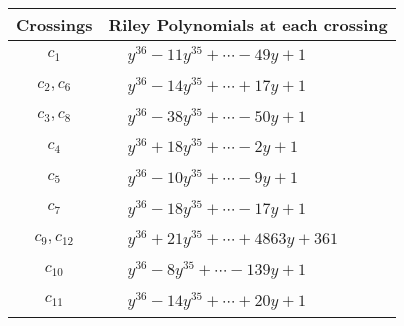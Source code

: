 \documentclass[1p]{elsarticle_modified}
\theoremstyle{definition}
\begin{document}
\begin{tabular}{m{50pt}|m{274pt}}
Crossings & \hspace{64pt}Riley Polynomials at each crossing \\
\hline $$\begin{aligned}c_{1}\end{aligned}$$&$\begin{aligned}
&y^{36}-11 y^{35}+\cdots-49 y+1
\end{aligned}$\\
\hline $$\begin{aligned}c_{2},c_{6}\end{aligned}$$&$\begin{aligned}
&y^{36}-14 y^{35}+\cdots+17 y+1
\end{aligned}$\\
\hline $$\begin{aligned}c_{3},c_{8}\end{aligned}$$&$\begin{aligned}
&y^{36}-38 y^{35}+\cdots-50 y+1
\end{aligned}$\\
\hline $$\begin{aligned}c_{4}\end{aligned}$$&$\begin{aligned}
&y^{36}+18 y^{35}+\cdots-2 y+1
\end{aligned}$\\
\hline $$\begin{aligned}c_{5}\end{aligned}$$&$\begin{aligned}
&y^{36}-10 y^{35}+\cdots-9 y+1
\end{aligned}$\\
\hline $$\begin{aligned}c_{7}\end{aligned}$$&$\begin{aligned}
&y^{36}-18 y^{35}+\cdots-17 y+1
\end{aligned}$\\
\hline $$\begin{aligned}c_{9},c_{12}\end{aligned}$$&$\begin{aligned}
&y^{36}+21 y^{35}+\cdots+4863 y+361
\end{aligned}$\\
\hline $$\begin{aligned}c_{10}\end{aligned}$$&$\begin{aligned}
&y^{36}-8 y^{35}+\cdots-139 y+1
\end{aligned}$\\
\hline $$\begin{aligned}c_{11}\end{aligned}$$&$\begin{aligned}
&y^{36}-14 y^{35}+\cdots+20 y+1
\end{aligned}$\\
\hline
\end{tabular}\\~\\
\end{document}
